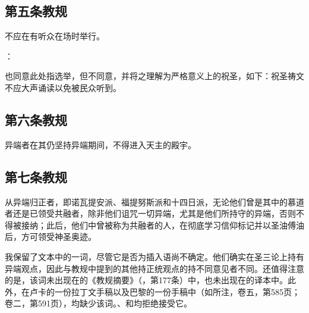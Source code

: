 
\subsection{第五条教规}

不应在有听众在场时举行。\par

：\par

也同意此处指选举，但不同意，并将之理解为严格意义上的祝圣，如下：祝圣祷文不应大声诵读以免被民众听到。\par


\subsection{第六条教规}

异端者在其仍坚持异端期间，不得进入天主的殿宇。\par


\subsection{第七条教规}

从异端归正者，即诺瓦提安派、福提努斯派和十四日派，无论他们曾是其中的慕道者还是已领受共融者，除非他们诅咒一切异端，尤其是他们所持守的异端，否则不得被接纳；此后，他们中曾被称为共融者的人，在彻底学习信仰标记并以圣油傅油后，方可领受神圣奥迹。\par

我保留了文本中的一词，尽管它是否为插入语尚不确定。他们确实在圣三论上持有异端观点，因此与教规中提到的其他持正统观点的持不同意见者不同。还值得注意的是，该词未出现在的《教规摘要》（，第177条）中，也未出现在的译本中。此外，在卢卡的一份拉丁文手稿以及巴黎的一份手稿中（如所注，卷五，第585页；卷二，第591页），均缺少该词。、和均拒绝接受它。\par

